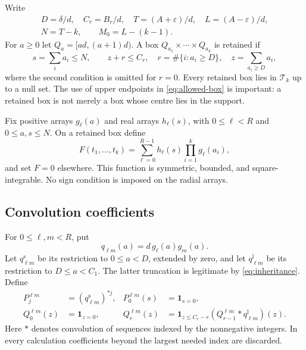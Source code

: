 \documentclass[11pt,reqno]{amsart}
\theoremstyle{definition}
\theoremstyle{remark}
\numberwithin{equation}{section}
\newcommand{\ind}{\mathbf 1}
\newcommand{\Tset}{\mathcal T}
\begin{document}
Write
\begin{equation}\label{eq:integer-parameters}
\begin{gathered}
 D=\delta/d,\quad C_r=B_r/d,\quad
 T=(A+\varepsilon)/d,\quad L=(A-\varepsilon)/d,\\
 N=T-k,\qquad M_0=L-(k-1).
\end{gathered}
\end{equation}
For $a\ge0$ let $Q_a=[ad,(a+1)d)$. A box
$Q_{a_1}\times\cdots\times Q_{a_k}$ is retained if
\begin{equation}\label{eq:allowed-box}
 s=\sum_i a_i\le N,\qquad z+r\le C_r,
 \quad r=\#\{i:a_i\ge D\},\quad z=\sum_{a_i\ge D}a_i,
\end{equation}
where the second condition is omitted for $r=0$.
Every retained box lies in $\Tset_k$ up to a null set. The use of upper
endpoints in \eqref{eq:allowed-box} is important: a retained box is not
merely a box whose centre lies in the support.

Fix positive arrays $g_\ell(a)$ and real arrays $h_\ell(s)$, with
$0\le\ell<R$ and $0\le a,s\le N$. On a retained box define
\begin{equation}\label{eq:finite-F}
 F(t_1,\ldots,t_k)=
 \sum_{\ell=0}^{R-1}h_\ell(s)\prod_{i=1}^k g_\ell(a_i),
\end{equation}
and set $F=0$ elsewhere. This function is symmetric, bounded, and
square-integrable. No sign condition is imposed on the radial arrays.

\subsection{Convolution coefficients}
For $0\le\ell,m<R$, put
\[
 q_{\ell m}(a)=d\,g_\ell(a)g_m(a).
\]
Let $q^{\mathrm s}_{\ell m}$ be its restriction to $0\le a<D$, extended
by zero, and let $q^{\mathrm l}_{\ell m}$ be its restriction to
$D\le a<C_1$. The latter truncation is legitimate by
\eqref{eq:inheritance}. Define
\begin{align}
 P^{\ell m}_j&=(q^{\mathrm s}_{\ell m})^{*j},&
 P^{\ell m}_0(s)&=\ind_{s=0},\label{eq:small-powers}\\
 Q^{\ell m}_0(z)&=\ind_{z=0},&
 Q^{\ell m}_r(z)&=\ind_{z\le C_r-r}
             (Q^{\ell m}_{r-1}*q^{\mathrm l}_{\ell m})(z).
             \label{eq:large-powers}
\end{align}
Here $*$ denotes convolution of sequences indexed by the nonnegative
integers. In every calculation coefficients beyond the largest needed
index are discarded.
\end{document}
